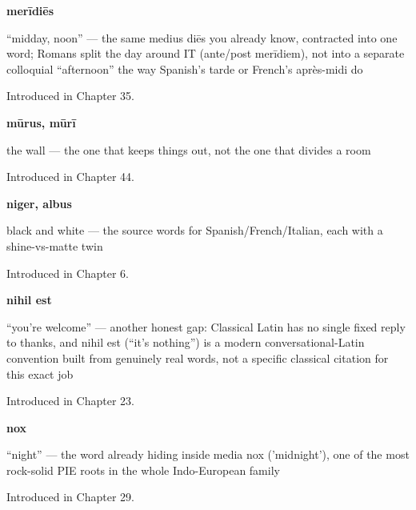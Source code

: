 \noindent\begin{minipage}[t]{\linewidth}
\raggedright
\textbf{merīdiēs}\par
\small \textquotedblleft{}midday, noon\textquotedblright{} — the same medius diēs you already know, contracted into one word; Romans split the day around IT (ante/post merīdiem), not into a separate colloquial \textquotedblleft{}afternoon\textquotedblright{} the way Spanish's tarde or French's après-midi do\par
\footnotesize Introduced in Chapter 35.
\end{minipage}\par\medskip

\noindent\begin{minipage}[t]{\linewidth}
\raggedright
\textbf{mūrus, mūrī}\par
\small the wall — the one that keeps things out, not the one that divides a room\par
\footnotesize Introduced in Chapter 44.
\end{minipage}\par\medskip

\noindent\begin{minipage}[t]{\linewidth}
\raggedright
\textbf{niger, albus}\par
\small black and white — the source words for Spanish/French/Italian, each with a shine-vs-matte twin\par
\footnotesize Introduced in Chapter 6.
\end{minipage}\par\medskip

\noindent\begin{minipage}[t]{\linewidth}
\raggedright
\textbf{nihil est}\par
\small \textquotedblleft{}you're welcome\textquotedblright{} — another honest gap: Classical Latin has no single fixed reply to thanks, and nihil est (\textquotedblleft{}it's nothing\textquotedblright{}) is a modern conversational-Latin convention built from genuinely real words, not a specific classical citation for this exact job\par
\footnotesize Introduced in Chapter 23.
\end{minipage}\par\medskip

\noindent\begin{minipage}[t]{\linewidth}
\raggedright
\textbf{nox}\par
\small \textquotedblleft{}night\textquotedblright{} — the word already hiding inside media nox ('midnight'), one of the most rock-solid PIE roots in the whole Indo-European family\par
\footnotesize Introduced in Chapter 29.
\end{minipage}\par\medskip

